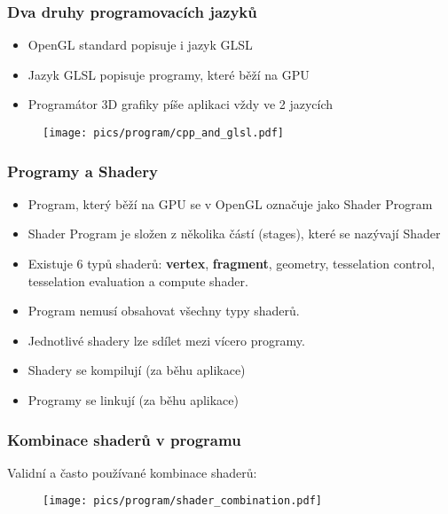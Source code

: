 
\begin{frame}
\frametitle{Dva druhy programovacích jazyků}
   \begin{itemize}
    \item OpenGL standard popisuje i jazyk GLSL
    \item Jazyk GLSL popisuje programy, které běží na GPU
    \item Programátor 3D grafiky píše aplikaci vždy ve 2 jazycích
  \end{itemize}
  \begin{figure}[h]
    \texttt{[image: pics/program/cpp\_and\_glsl.pdf]}
  \end{figure}
\end{frame}

\begin{frame}
\frametitle{Programy a Shadery}
  \begin{itemize}
  \item Program, který běží na GPU se v OpenGL označuje jako Shader Program
  \item Shader Program je složen z několika částí (stages), které se nazývají Shader
  \item Existuje 6 typů shaderů: \textbf{vertex}, \textbf{fragment}, geometry, tesselation control, tesselation evaluation a compute shader.
  \item Program nemusí obsahovat všechny typy shaderů.
  \item Jednotlivé shadery lze sdílet mezi vícero programy.
  \item Shadery se kompilují (za běhu aplikace)
  \item Programy se linkují (za běhu aplikace)
  \end{itemize}
\end{frame}

\begin{frame}
\frametitle{Kombinace shaderů v programu}
  Validní a často používané kombinace shaderů:
  \begin{figure}[h]
    \texttt{[image: pics/program/shader\_combination.pdf]}
  \end{figure}
\end{frame}

